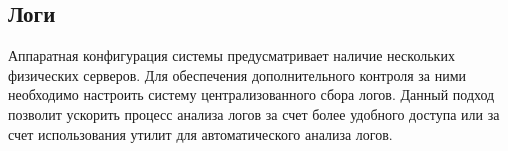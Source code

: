\subsection{Логи}
Аппаратная конфигурация системы предусматривает наличие нескольких физических
серверов. Для обеспечения дополнительного контроля за ними необходимо настроить
систему централизованного сбора логов. Данный подход позволит ускорить процесс
анализа логов за счет более удобного доступа или за счет использования утилит
для автоматического анализа логов.
